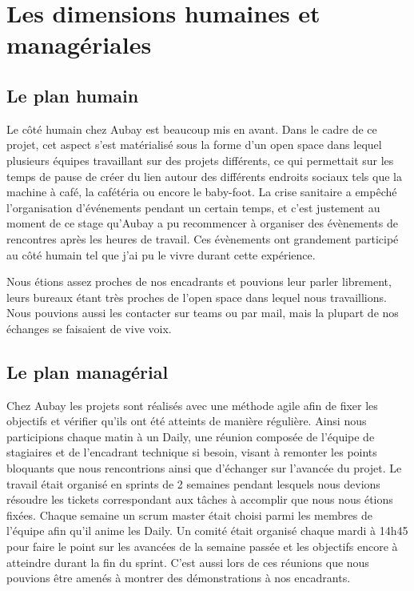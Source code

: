 \documentclass[11pt]{article}
\begin{document}
  \pagebreak

  \section{Les dimensions humaines et managériales} 
    \subsection{Le plan humain}
      Le côté humain chez Aubay est beaucoup mis en avant. Dans le cadre de ce projet, cet aspect s'est 
      matérialisé sous la forme d'un open space dans lequel plusieurs équipes travaillant sur des projets 
      différents, ce qui permettait sur les temps de pause de créer du lien autour des différents endroits 
      sociaux tels que la machine à café, la cafétéria ou encore le baby-foot. La crise sanitaire a empêché
      l'organisation d'événements pendant un certain temps, et c'est justement au moment de ce stage qu'Aubay 
      a pu recommencer à organiser des évènements de rencontres après les heures de travail. Ces évènements 
      ont grandement participé au côté humain tel que j'ai pu le vivre durant cette expérience.

      Nous étions assez proches de nos encadrants et pouvions leur parler librement, leurs bureaux étant très 
      proches de l'open space dans lequel nous travaillions. Nous pouvions aussi les contacter sur teams ou 
      par mail, mais la plupart de nos échanges se faisaient de vive voix.

    \subsection{Le plan managérial}
      Chez Aubay les projets sont réalisés avec une méthode agile afin de fixer les objectifs et vérifier qu'ils
      ont été atteints de manière régulière. Ainsi nous participions chaque matin à un Daily, une réunion
      composée de l'équipe de stagiaires et de l'encadrant technique si besoin, 
      visant à remonter les points bloquants que nous rencontrions ainsi que d'échanger sur l'avancée du projet.
      Le travail était organisé en sprints de 2 semaines pendant lesquels nous devions résoudre les tickets
      correspondant aux tâches à accomplir que nous nous étions fixées. Chaque semaine un scrum master était
      choisi parmi les membres de l'équipe afin qu'il anime les Daily. Un comité était organisé chaque mardi
      à 14h45 pour faire le point sur les avancées de la semaine passée et les objectifs encore à atteindre
      durant la fin du sprint. C'est aussi lors de ces réunions que nous pouvions être amenés à montrer des 
      démonstrations à nos encadrants. 
\end{document}

